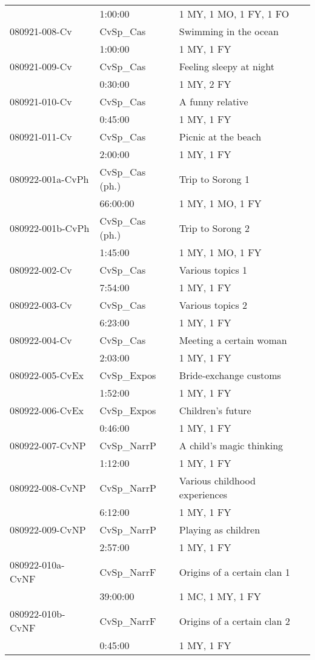 {\begin{longtable}{p{2.75cm}@{\hspace{1em}}p{2.75cm}@{\hspace{1em}}p{5.75cm}}
& 1:00:00 & 1 MY, 1 MO, 1 FY, 1 FO\\
080921-008-Cv & CvSp\_Cas & Swimming in the ocean\\
& 1:00:00 & 1 MY, 1 FY\\
080921-009-Cv & CvSp\_Cas & Feeling sleepy at night\\
& 0:30:00 & 1 MY, 2 FY\\
080921-010-Cv & CvSp\_Cas & A funny relative\\
& 0:45:00 & 1 MY, 1 FY\\
080921-011-Cv & CvSp\_Cas & Picnic at the beach\\
& 2:00:00 & 1 MY, 1 FY\\
080922-001a-CvPh & CvSp\_Cas (ph.) & Trip to Sorong 1\\
& 66:00:00 & 1 MY, 1 MO, 1 FY\\
080922-001b-CvPh & CvSp\_Cas (ph.) & Trip to Sorong 2\\
& 1:45:00 & 1 MY, 1 MO, 1 FY\\
080922-002-Cv & CvSp\_Cas & Various topics 1\\
& 7:54:00 & 1 MY, 1 FY\\
080922-003-Cv & CvSp\_Cas & Various topics 2\\
& 6:23:00 & 1 MY, 1 FY\\
080922-004-Cv & CvSp\_Cas & Meeting a certain woman\\
& 2:03:00 & 1 MY, 1 FY\\
080922-005-CvEx & CvSp\_Expos & Bride-exchange customs\\
& 1:52:00 & 1 MY, 1 FY\\
080922-006-CvEx & CvSp\_Expos & Children’s future\\
& 0:46:00 & 1 MY, 1 FY\\
080922-007-CvNP & CvSp\_NarrP & A child’s magic thinking\\
& 1:12:00 & 1 MY, 1 FY\\
080922-008-CvNP & CvSp\_NarrP & Various childhood experiences\\
& 6:12:00 & 1 MY, 1 FY\\
080922-009-CvNP & CvSp\_NarrP & Playing as children\\
& 2:57:00 & 1 MY, 1 FY\\
080922-010a-CvNF & CvSp\_NarrF & Origins of a certain clan 1\\
& 39:00:00 & 1 MC, 1 MY, 1 FY\\
080922-010b-CvNF & CvSp\_NarrF & Origins of a certain clan 2\\
& 0:45:00 & 1 MY, 1 FY\\

\end{longtable}}

